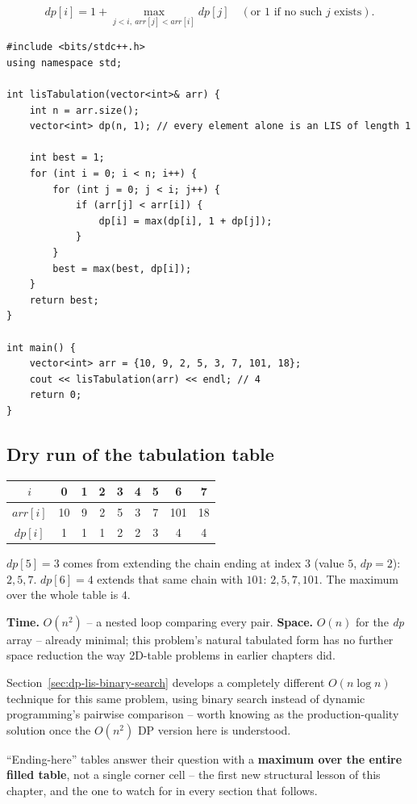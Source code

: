 \[
  \textit{dp}[i] = 1 + \max_{j<i,\ \textit{arr}[j]<\textit{arr}[i]}
  \textit{dp}[j] \quad (\text{or } 1 \text{ if no such } j \text{ exists}).
\]

\begin{lstlisting}
#include <bits/stdc++.h>
using namespace std;

int lisTabulation(vector<int>& arr) {
    int n = arr.size();
    vector<int> dp(n, 1); // every element alone is an LIS of length 1

    int best = 1;
    for (int i = 0; i < n; i++) {
        for (int j = 0; j < i; j++) {
            if (arr[j] < arr[i]) {
                dp[i] = max(dp[i], 1 + dp[j]);
            }
        }
        best = max(best, dp[i]);
    }
    return best;
}

int main() {
    vector<int> arr = {10, 9, 2, 5, 3, 7, 101, 18};
    cout << lisTabulation(arr) << endl; // 4
    return 0;
}
\end{lstlisting}

\subsection*{Dry run of the tabulation table}


\begin{center}
\begin{tabular}{c|c|c|c|c|c|c|c|c}
$i$ & 0 & 1 & 2 & 3 & 4 & 5 & 6 & 7 \\ \hline
$\textit{arr}[i]$ & 10 & 9 & 2 & 5 & 3 & 7 & 101 & 18 \\ \hline
$\textit{dp}[i]$ & 1 & 1 & 1 & 2 & 2 & 3 & 4 & 4
\end{tabular}
\end{center}

$\textit{dp}[5]=3$ comes from extending the chain ending at index $3$
(value $5$, $\textit{dp}=2$): $2,5,7$. $\textit{dp}[6]=4$ extends that
same chain with $101$: $2,5,7,101$. The maximum over the whole table is
$4$.

\begin{complexitybox}
\textbf{Time.} $O(n^2)$ -- a nested loop comparing every pair.
\textbf{Space.} $O(n)$ for the \textit{dp} array -- already minimal;
this problem's natural tabulated form has no further space reduction
the way 2D-table problems in earlier chapters did.
\end{complexitybox}

\begin{ideabox}
Section~\ref{sec:dp-lis-binary-search} develops a completely different
$O(n \log n)$ technique for this same problem, using binary search
instead of dynamic programming's pairwise comparison -- worth knowing
as the production-quality solution once the $O(n^2)$ DP version here is
understood.
\end{ideabox}

\begin{takeawaybox}
``Ending-here'' tables answer their question with a \textbf{maximum
over the entire filled table}, not a single corner cell -- the first
new structural lesson of this chapter, and the one to watch for in
every section that follows.
\end{takeawaybox}
